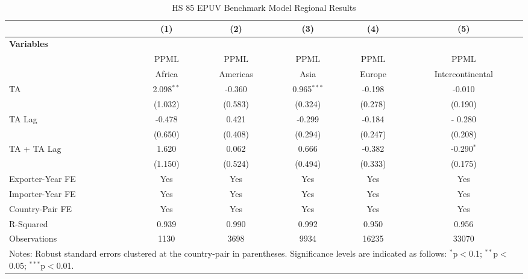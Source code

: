 \begin{table}[htbp]
    \centering
    \caption{HS 85 EPUV Benchmark Model Regional Results}
    \label{tab:85_benchmark_region_analysis} %
    \begin{adjustbox}{max width=\textwidth}
    \begin{tabular}{l@{\extracolsep{1pt}}ccccc}
    \hline
    & \multicolumn{1}{c}{(1)} & \multicolumn{1}{c}{(2)} & \multicolumn{1}{c}{(3)} & \multicolumn{1}{c}{(4)} & \multicolumn{1}{c}{(5)} \\
    \hline
    \textbf{Variables} &  &  &  &  &  \\
    \hline
     & PPML & PPML & PPML & PPML & PPML \\
     & Africa & Americas & Asia & Europe & Intercontinental \\
    \hline
    TA & 2.098$^{\ast\ast}$ & -0.360 & 0.965$^{\ast\ast\ast}$ & -0.198 & -0.010 \\
    & (1.032) & (0.583) & (0.324) & (0.278) & (0.190) \\

    TA Lag & -0.478 & 0.421 & -0.299 & -0.184 &- 0.280 \\
    & (0.650) & (0.408) & (0.294) & (0.247) & (0.208) \\

    TA + TA Lag & 1.620 & 0.062 & 0.666 & -0.382 & -0.290$^{\ast}$ \\
    & (1.150) & (0.524) & (0.494) & (0.333) & (0.175) \\
    \hline
    Exporter-Year FE & Yes & Yes & Yes & Yes & Yes \\
    Importer-Year FE & Yes & Yes & Yes & Yes & Yes \\
    Country-Pair FE & Yes & Yes & Yes & Yes & Yes \\
    R-Squared & 0.939 & 0.990 & 0.992 & 0.950 & 0.956 \\
    Observations & 1130 & 3698 & 9934 & 16235 & 33070 \\
    \hline
    \multicolumn{6}{l}{\footnotesize{Notes: Robust standard errors clustered at the country-pair in parentheses. Significance levels are indicated as follows: $^{\ast}$p$<$0.1; $^{\ast\ast}$p$<$0.05; $^{\ast\ast\ast}$p$<$0.01.}} \\
    \end{tabular}
    \end{adjustbox}
\end{table}
